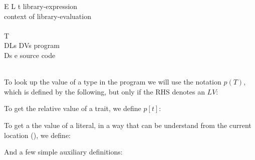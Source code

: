 \begin{bnf}
{E}      {L \mmid{} t \mmid{}  \mmid{} }           {library-expression}\\  {context of library-evaluation}\\           {}\\      { T}                                                 {}\\      {DLs\Q{;} DVs}                                                     {program}\\      {Ds e}                                                             {source code}
\end{bnf}
\\

\noindent To look up the value of a type in the program we will use the notation $p(T)$, which is defined by the following, but only if the RHS denotes an $LV$:
\begin{defye}%
%
%
%
\end{defye}

\noindent To get the relative value of a trait, we define $p[t]$:
\begin{defye}%
\end{defye}

\noindent To get a the value of a literal, in a way that can be understand from the current location (), we define:
\begin{defye}%
\end{defye}

\noindent And a few simple auxiliary definitions:
\begin{defye}%
\end{defye}

